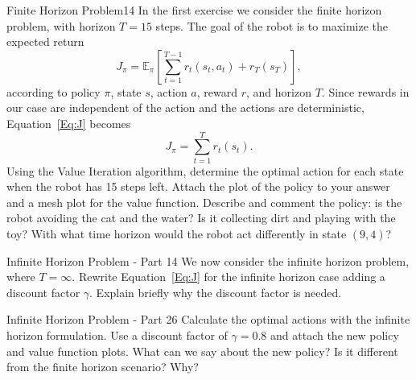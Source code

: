 \begin{questions}

\begin{question}{Finite Horizon Problem}{14}
In the first exercise we consider the finite horizon problem, with horizon $T=15$ steps.
The goal of the robot is to maximize the expected return 
\begin{equation}
J_\pi = \mathbb{E}_\pi\left[\sum_{t=1}^{T-1}r_t(s_t,a_t)+r_T(s_T)\right], \label{Eq:J}
\end{equation}
according to policy $\pi$, state $s$, action $a$, reward $r$, and horizon $T$. Since rewards in our case are independent of the action and the actions are deterministic, Equation~\eqref{Eq:J} becomes
\begin{equation}
J_\pi = \sum_{t=1}^{T}r_t(s_t).
\end{equation}
Using the Value Iteration algorithm, determine the optimal action for each state when the robot has 15 steps left. Attach the plot of the policy to your answer and a mesh plot for the value function. Describe and comment the policy: is the robot avoiding the cat and the water? Is it collecting dirt and playing with the toy? With what time horizon would the robot act differently in state $(9,4)$?

\begin{answer}\end{answer}

\end{question}



\begin{question}{Infinite Horizon Problem - Part 1}{4}
We now consider the infinite horizon problem, where $T=\infty$. Rewrite Equation~\eqref{Eq:J} for the infinite horizon case adding a discount factor $\gamma$. Explain briefly why the discount factor is needed.

\begin{answer}\end{answer}

\end{question}



\begin{question}{Infinite Horizon Problem - Part 2}{6}
Calculate the optimal actions with the infinite horizon formulation. Use a discount factor of $\gamma=0.8$ and attach the new policy and value function plots.
What can we say about the new policy? Is it different from the finite horizon scenario? Why?


\end{question}
\end{questions}
